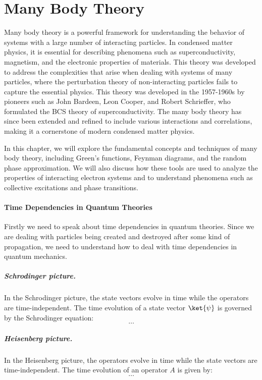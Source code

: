 \chapter{Many Body Theory}

Many body theory is a powerful framework for understanding the behavior of systems with a large number of interacting particles. In condensed matter physics, it is essential for describing phenomena such as superconductivity, magnetism, and the electronic properties of materials. This theory was developed to address the complexities that arise when dealing with systems of many particles, where the perturbation theory of non-interacting particles fails to capture the essential physics. This theory was developed in the 1957-1960s by pioneers such as John Bardeen, Leon Cooper, and Robert Schrieffer, who formulated the BCS theory of superconductivity. The many body theory has since been extended and refined to include various interactions and correlations, making it a cornerstone of modern condensed matter physics.

In this chapter, we will explore the fundamental concepts and techniques of many body theory, including Green's functions, Feynman diagrams, and the random phase approximation. We will also discuss how these tools are used to analyze the properties of interacting electron systems and to understand phenomena such as collective excitations and phase transitions.

\subsubsection{Time Dependencies in Quantum Theories}

Firstly we need to speak about time dependencies in quantum theories. Since we are dealing with particles being created and destroyed after some kind of propagation, we need to understand how to deal with time dependencies in quantum mechanics.

\paragraph{Schrodinger picture.} In the Schrodinger picture, the state vectors evolve in time while the operators are time-independent. The time evolution of a state vector \(\ket{\psi}\) is governed by the Schrodinger equation:
\[
    \dots
\]

\paragraph{Heisenberg picture.} In the Heisenberg picture, the operators evolve in time while the state vectors are time-independent. The time evolution of an operator \(A\) is given by:
\[
    \dots
\]

